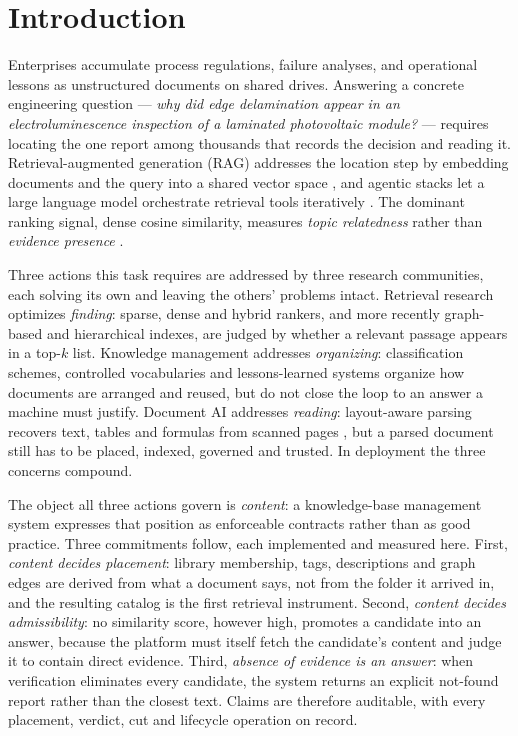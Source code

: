 \section{Introduction}
\label{sec:intro}

Enterprises accumulate process regulations, failure analyses, and operational
lessons as unstructured documents on shared drives. Answering a concrete
engineering question --- \emph{why did edge delamination appear in an
electroluminescence inspection of a laminated photovoltaic module?} ---
requires locating the one report among thousands that records the decision and
reading it. Retrieval-augmented generation (RAG) addresses the location step by
embedding documents and the query into a shared vector space
\cite{rag-lewis,dpr}, and agentic stacks let a large language model orchestrate
retrieval tools iteratively \cite{mcp,singh-agentic-rag}. The dominant ranking
signal, dense cosine similarity, measures \emph{topic relatedness} rather than
\emph{evidence presence} \cite{siren,gao-ragsurvey}.

Three actions this task requires are addressed by three research communities,
each solving its own and leaving the others' problems intact. Retrieval
research optimizes \emph{finding}: sparse, dense and hybrid rankers, and more
recently graph-based and hierarchical indexes, are judged by whether a relevant
passage appears in a top-$k$ list. Knowledge management addresses
\emph{organizing}: classification schemes, controlled vocabularies and
lessons-learned systems organize how documents are arranged and reused, but do
not close the loop to an answer a machine must justify. Document AI
addresses \emph{reading}: layout-aware parsing recovers text, tables and
formulas from scanned pages \cite{mineru}, but a parsed document still has to
be placed, indexed, governed and trusted. In deployment the three concerns
compound.

The object all three actions govern is \emph{content}: a knowledge-base
management system expresses that position as enforceable contracts rather than
as good practice. Three commitments follow, each implemented and measured here.
First, \emph{content decides placement}: library membership, tags, descriptions
and graph edges are derived from what a document says, not from the folder it
arrived in, and the resulting catalog is the first retrieval instrument.
Second, \emph{content decides admissibility}: no similarity score, however
high, promotes a candidate into an answer, because the platform must itself
fetch the candidate's content and judge it to contain direct evidence. Third,
\emph{absence of evidence is an answer}: when verification eliminates every
candidate, the system returns an explicit not-found report rather than the
closest text. Claims are therefore auditable, with every placement, verdict,
cut and lifecycle operation on record.

